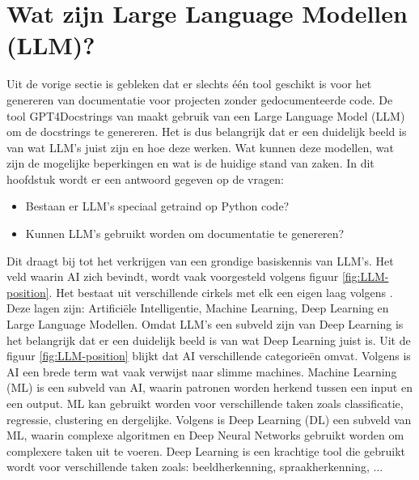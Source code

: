 \begin{table}[h!]
  \centering
  \caption{Overzicht van wat de tools kunnen genereren}
  \label{table:ra-tools}
  \end{table}

\section{Wat zijn Large Language Modellen (LLM)?}
\label{sec:wat-zijn-llms}

Uit de vorige sectie is gebleken dat er slechts één tool geschikt is voor het genereren van documentatie voor projecten zonder gedocumenteerde code. 
De tool GPT4Docstrings van \textcite{Trofficus2023} maakt gebruik van een Large Language Model (LLM) om de docstrings te genereren.
Het is dus belangrijk dat er een duidelijk beeld is van wat LLM's juist zijn en hoe deze werken.
Wat kunnen deze modellen, wat zijn de mogelijke beperkingen en wat is de huidige stand van zaken. 
In dit hoofdstuk wordt er een antwoord gegeven op de vragen: 
\begin{itemize}
  \item Bestaan er LLM's speciaal getraind op Python code? 
  \item Kunnen LLM's gebruikt worden om documentatie te genereren?
\end{itemize}

Dit draagt bij tot het verkrijgen van een grondige basiskennis van LLM's. 
Het veld waarin AI zich bevindt, wordt vaak voorgesteld volgens figuur \ref{fig:LLM-position}. Het bestaat uit verschillende cirkels met elk een eigen laag volgens \textcite{Stoeffelbauer2023}.
Deze lagen zijn: Artificiële Intelligentie, Machine Learning, Deep Learning en Large Language Modellen.
Omdat LLM's een subveld zijn van Deep Learning is het belangrijk dat er een duidelijk beeld is van wat Deep Learning juist is.
Uit de figuur \ref{fig:LLM-position} blijkt dat AI verschillende categorieën omvat.
Volgens \textcite{Stoeffelbauer2023} is AI een brede term wat vaak verwijst naar slimme machines. 
Machine Learning (ML) is een subveld van AI, waarin patronen worden herkend tussen een input en een output.
ML kan gebruikt worden voor verschillende taken zoals classificatie, regressie, clustering en dergelijke.
Volgens \textcite{Stoeffelbauer2023} is Deep Learning (DL) een subveld van ML, waarin complexe algoritmen en Deep Neural Networks gebruikt worden om complexere taken uit te voeren.
Deep Learning is een krachtige tool die gebruikt wordt voor verschillende taken zoals: beeldherkenning, spraakherkenning, ...

